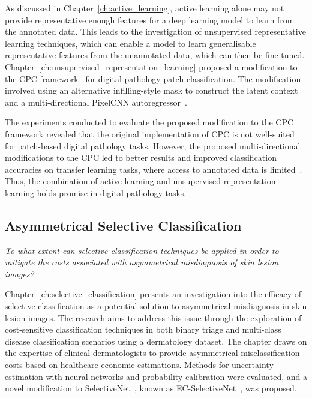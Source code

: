 As discussed in Chapter~\ref{ch:active_learning}, active learning alone may not provide representative enough features for a deep learning model to learn from the annotated data. This leads to the investigation of unsupervised representative learning techniques, which can enable a model to learn generalisable representative features from the unannotated data, which can then be fine-tuned. Chapter~\ref{ch:unsupervised_representation_learning} proposed a modification to the CPC framework~\citep{oord2018representation} for digital pathology patch classification. The modification involved using an alternative infilling-style mask to construct the latent context and a multi-directional PixelCNN autoregressor~\citep{oord2016pixel}.

The experiments conducted to evaluate the proposed modification to the CPC framework revealed that the original implementation of CPC is not well-suited for patch-based digital pathology tasks. However, the proposed multi-directional modifications to the CPC led to better results and improved classification accuracies on transfer learning tasks, where access to annotated data is limited~\citep{carse2021unsupervised}. Thus, the combination of active learning and unsupervised representation learning holds promise in digital pathology tasks.

\newpage
\subsection{Asymmetrical Selective Classification}
\textit{To what extent can selective classification techniques be applied in order to mitigate the costs associated with asymmetrical misdiagnosis of skin lesion images?}


Chapter~\ref{ch:selective_classification} presents an investigation into the efficacy of selective classification as a potential solution to asymmetrical misdiagnosis in skin lesion images. The research aims to address this issue through the exploration of cost-sensitive classification techniques in both binary triage and multi-class disease classification scenarios using a dermatology dataset. The chapter draws on the expertise of clinical dermatologists to provide asymmetrical misclassification costs based on healthcare economic estimations. Methods for uncertainty estimation with neural networks and probability calibration were evaluated, and a novel modification to SelectiveNet~\citep{geifman2019selectivenet}, known as EC-SelectiveNet~\citep{carse2021robust}, was proposed. 

